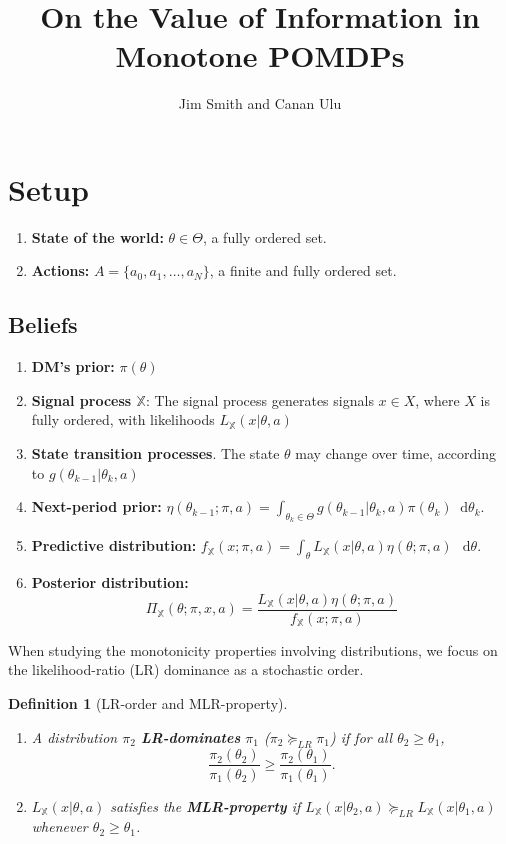 \documentclass[11pt,onecolumn]{article}
\theoremstyle{plain}
\newtheorem{definition}{Definition}
\newcommand{\iX}[0]{{\mathbb{X}}}
\newcommand\dif{\mathop{}\!\mathrm{d}}
\begin{document}
\title{On the Value of Information in Monotone POMDPs}
\author{Jim Smith and Canan Ulu}
\maketitle


\section{Setup}
\begin{enumerate}
    \item \textbf{State of the world:} $\theta\in \Theta$, a fully ordered set.
    \item \textbf{Actions:} $A=\{a_0, a_1, \ldots, a_N\}$, a finite and fully ordered set.
\end{enumerate}
\subsection{Beliefs}
\begin{enumerate}
    \item \textbf{DM's prior:}  $\pi(\theta)$
    \item \textbf{Signal process $\iX$}: The signal process generates signals $x \in X$, where $X$ is fully ordered, with likelihoods $L_\iX(x|\theta, a)$
    \item \textbf{State transition processes}. The state $\theta$ may change over time, according to $g(\theta_{k-1}|\theta_k, a)$
    \item \textbf{Next-period prior:} $\eta(\theta_{k-1}; \pi, a) = \int_{\theta_k \in \Theta} g(\theta_{k-1}|\theta_k, a) \pi(\theta_k) \dif \theta_k$.
    \item \textbf{Predictive distribution:} $f_\iX(x;\pi, a)=\int_\theta L_\iX(x|\theta,a) \eta(\theta; \pi, a)\,\dif \theta$.
    \item \textbf{Posterior distribution:} $$\Pi_\iX(\theta; \pi, x, a) = \frac{ L_\iX(x|\theta,a) \eta(\theta; \pi, a)}{f_\iX(x;\pi, a)}$$
\end{enumerate}

When studying the monotonicity properties involving distributions, we focus on the likelihood-ratio (LR) dominance as a stochastic order.

\begin{definition}[LR-order and MLR-property]\quad
    \begin{enumerate}
        \item
    A distribution $\pi_2$ \textbf{LR-dominates} $\pi_1$ ($\pi_2 \succeq_{LR} \pi_1$) if for all $\theta_2\geq \theta_1$,
    \begin{equation}
        \frac{\pi_2(\theta_2)}{\pi_1(\theta_2)}\geq \frac{\pi_2(\theta_1)}{\pi_1(\theta_1)}.
    \end{equation}
    \item $L_\iX(x|\theta, a)$ satisfies the \textbf{MLR-property} if $L_\iX(x|\theta_2, a) \succeq_{LR}L_\iX(x|\theta_1, a)$ whenever $\theta_2 \geq \theta_1$.
      \end{enumerate}
\end{definition}
\end{document}
